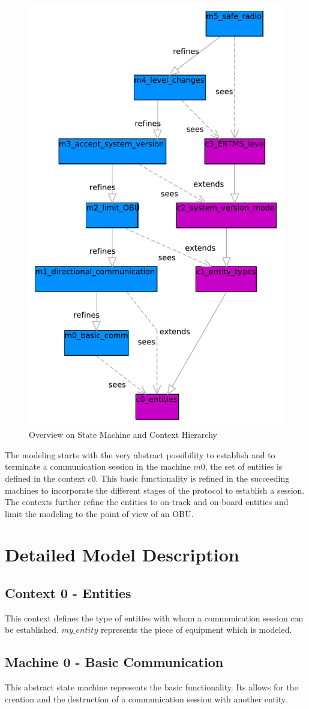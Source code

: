 \documentclass[10pt,a4paper]{article}
\begin{document}
\begin{figure}[ht]
  \centering
  \includegraphics[width=.5\textwidth]{Subset_026_comm_session}
  \caption{Overview on State Machine and Context Hierarchy}
  \label{fig:model-overview}
\end{figure}

The modeling starts with the very abstract possibility to establish and to
terminate a communication session in the machine $m0$, the set of entities is
defined in the context $c0$. This basic functionality is refined in the
succeeding machines to incorporate the different stages of the protocol to
establish a session. The contexts further refine the entities to on-track and
on-board entities and limit the modeling to the point of view of an OBU.

\section{Detailed Model Description}
\label{sec:deta-model-descr}

\subsection{Context 0 - Entities}
\label{sec:context-0-entities}

This context defines the type of entities with whom a communication session can
be established.  $my\_entity$ represents the piece of equipment which is
modeled.



\subsection{Machine 0 - Basic Communication}
\label{sec:machine-0-basic}

This abstract state machine represents the basic functionality. Its allows
for the creation and the destruction of a communication session with another
entity.


\end{document}
